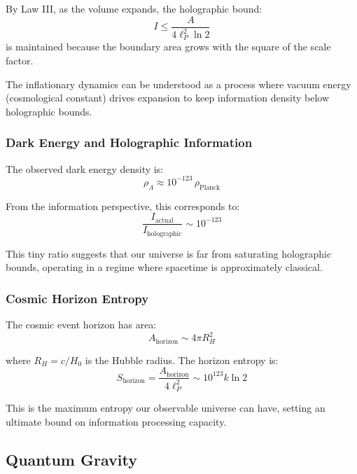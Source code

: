 \documentclass[11pt,a4paper]{article}
\theoremstyle{plain}
\theoremstyle{definition}
\theoremstyle{remark}
\begin{document}
By Law III, as the volume expands, the holographic bound:
\begin{equation}
I \leq \frac{A}{4\ell_P^2\ln 2}
\end{equation}
is maintained because the boundary area grows with the square of the scale factor.

The inflationary dynamics can be understood as a process where vacuum energy (cosmological constant) drives expansion to keep information density below holographic bounds.

\subsubsection{Dark Energy and Holographic Information}

The observed dark energy density is:
\begin{equation}
\rho_{\Lambda} \approx 10^{-123}\,\rho_{\text{Planck}}
\end{equation}

From the information perspective, this corresponds to:
\begin{equation}
\frac{I_{\text{actual}}}{I_{\text{holographic}}} \sim 10^{-123}
\end{equation}

This tiny ratio suggests that our universe is far from saturating holographic bounds, operating in a regime where spacetime is approximately classical.

\subsubsection{Cosmic Horizon Entropy}

The cosmic event horizon has area:
\begin{equation}
A_{\text{horizon}} \sim 4\pi R_H^2
\end{equation}

where $R_H = c/H_0$ is the Hubble radius. The horizon entropy is:
\begin{equation}
S_{\text{horizon}} = \frac{A_{\text{horizon}}}{4\ell_P^2} \sim 10^{123}k\ln 2
\end{equation}

This is the maximum entropy our observable universe can have, setting an ultimate bound on information processing capacity.

\subsection{Quantum Gravity}
\end{document}
